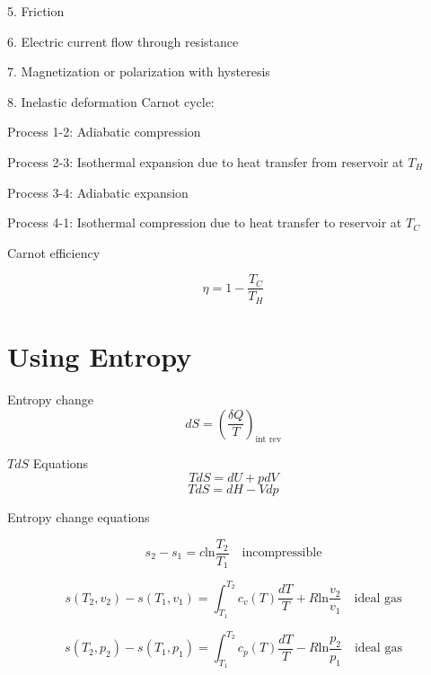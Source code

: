\documentclass[paper=letter, fontsize=11pt]{scrartcl}
\numberwithin{equation}{section}        %
\numberwithin{figure}{section}          %
\numberwithin{table}{section}               %
\begin{document}
5. Friction

6. Electric current flow through resistance

7. Magnetization or polarization with hysteresis

8. Inelastic deformation
\newline
\newline
Carnot cycle:

Process 1-2: Adiabatic compression

Process 2-3: Isothermal expansion due to heat transfer from reservoir at $T_H$

Process 3-4: Adiabatic expansion

Process 4-1: Isothermal compression due to heat transfer to reservoir at $T_C$

Carnot efficiency

\begin{equation}
    \eta = 1 - \frac{T_C}{T_H}
\end{equation}

\section{Using Entropy}

Entropy change
\begin{equation}
    d S = \left(\frac{\delta Q}{T}\right)_\text{int rev}
\end{equation}

$TdS$ Equations
\begin{equation}
    T dS = dU + p dV
\end{equation}
\begin{equation}
    T dS = dH - V dp
\end{equation}

Entropy change equations

\begin{equation}
    s_2-s_1 = c \text{ln}\frac{T_2}{T_1}\quad\text{incompressible}
\end{equation}

\begin{equation}
    s(T_2,v_2)-s(T_1,v_1) = \int_{T_1}^{T_2}c_v(T)\frac{dT}{T} + R \text{ln}\frac{v_2}{v_1}  \quad\text{ideal gas}
\end{equation}

\begin{equation}
    s(T_2,p_2)-s(T_1,p_1) = \int_{T_1}^{T_2}c_p(T)\frac{dT}{T} - R \text{ln}\frac{p_2}{p_1}  \quad\text{ideal gas}
\end{equation}
\end{document}

